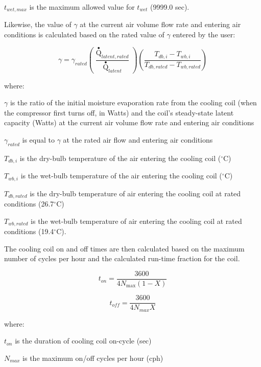 \(t_{wet,max}\) is the maximum allowed value for \(t_{wet}\) (9999.0 sec).

Likewise, the value of \(\gamma\) at the current air volume flow rate and entering air conditions is calculated based on the rated value of \(\gamma\) entered by the user:

\begin{equation}
  \gamma = {\gamma_{rated}}\left( {\frac{{{{\mathop Q\limits^ \bullet  }_{latent,rated}}}}{{{{\mathop Q\limits^ \bullet  }_{latent}}}}} \right)\left( {\frac{{{T_{db,i}} - {T_{wb,i}}}}{{{T_{db,rated}} - {T_{wb,rated}}}}} \right)
\end{equation}

where:

\(\gamma\) is the ratio of the initial moisture evaporation rate from the cooling coil (when the compressor first turns off, in Watts) and the coil's steady-state latent capacity (Watts) at the current air volume flow rate and entering air conditions

\({\gamma_{rated}}\) is equal to \(\gamma\) at the rated air flow and entering air conditions

\(T_{db,i}\) is the dry-bulb temperature of the air entering the cooling coil (\(^{\circ}\)C)

\(T_{wb,i}\) is the wet-bulb temperature of the air entering the cooling coil (\(^{\circ}\)C)

\(T_{db,rated}\) is the dry-bulb temperature of air entering the cooling coil at rated conditions (26.7\(^{\circ}\)C)

\(T_{wb,rated}\) is the wet-bulb temperature of air entering the cooling coil at rated conditions (19.4\(^{\circ}\)C).

The cooling coil on and off times are then calculated based on the maximum number of cycles per hour and the calculated run-time fraction for the coil.

\begin{equation}
{t_{on}} = \frac{{3600}}{{4{N_{\max }}\left( {1 - X} \right)}}
\end{equation}

\begin{equation}
{t_{off}} = \frac{{3600}}{{4{N_{max}}X}}
\end{equation}

where:

\(t_{on}\) is the duration of cooling coil on-cycle (sec)

\(N_{max}\) is the maximum on/off cycles per hour (cph)

